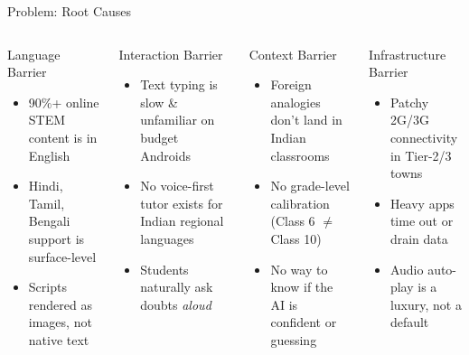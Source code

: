 \documentclass[aspectratio=169, 12pt]{beamer}
\begin{document}
\begin{frame}{Problem: Root Causes}
  \begin{columns}[T]
      \begin{block}{Language Barrier}
        \begin{itemize}
          \item 90\%+ online STEM content is in English
          \item Hindi, Tamil, Bengali support is surface-level
          \item Scripts rendered as images, not native text
        \end{itemize}
      \end{block}
      \vspace{6pt}
      \begin{block}{Interaction Barrier}
        \begin{itemize}
          \item Text typing is slow \& unfamiliar on budget Androids
          \item No voice-first tutor exists for Indian regional languages
          \item Students naturally ask doubts \emph{aloud}
        \end{itemize}
      \end{block}
      \begin{block}{Context Barrier}
        \begin{itemize}
          \item Foreign analogies don't land in Indian classrooms
          \item No grade-level calibration (Class 6 $\neq$ Class 10)
          \item No way to know if the AI is confident or guessing
        \end{itemize}
      \end{block}
      \vspace{6pt}
      \begin{block}{Infrastructure Barrier}
        \begin{itemize}
          \item Patchy 2G/3G connectivity in Tier-2/3 towns
          \item Heavy apps time out or drain data
          \item Audio auto-play is a luxury, not a default
        \end{itemize}
      \end{block}
  \end{columns}
\end{frame}
\end{document}
